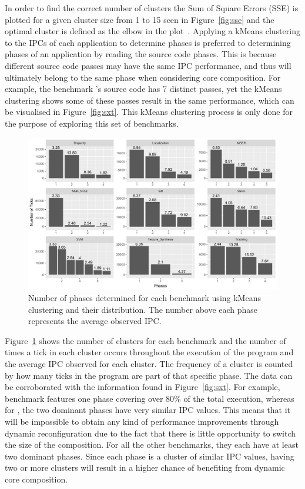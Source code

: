 In order to find the correct number of clusters the Sum of Square Errors (SSE) is plotted for a given cluster size from 1 to 15 seen in Figure~\ref{fig:sse} and the optimal cluster is defined as the elbow in the plot~\cite{everitCluster2001}.
Applying a kMeans clustering to the IPCs of each application to determine phases is preferred to determining phases of an application by reading the source code phases.
This is because different source code passes may have the same IPC performance, and thus will ultimately belong to the same phase when considering core composition.
For example, the benchmark 's source code has 7 distinct passes, yet the kMeans clustering shows some of these passes result in the same performance, which can be visualised in Figure~\ref{fig:sxt}.
This kMeans clustering process is only done for the purpose of exploring this set of benchmarks.

\begin{figure}[t]
    \centering
    \includegraphics[width=1\textwidth]{cases-paper/graphics/Exploration/clusters4.pdf}
    \caption{Number of phases determined for each benchmark using kMeans clustering and their distribution. The number above each phase represents the average observed IPC.}
    \label{fig:clust}
		\vspace{1em}
\end{figure}

Figure~\ref{fig:clust} shows the number of clusters for each benchmark and the number of times a tick in each cluster occurs throughout the execution of the program and the average IPC observed for each cluster.
The frequency of a cluster is counted by how many ticks in the program are part of that specific phase.
The data can be corroborated with the information found in Figure~\ref{fig:sxt}.
For example, benchmark  features one phase covering over 80\% of the total execution, whereas for , the two dominant phases have very similar IPC values.
This means that it will be impossible to obtain any kind of performance improvements through dynamic reconfiguration due to the fact that there is little opportunity to switch the size of the composition.
For all the other benchmarks, they each have at least two dominant phases.
Since each phase is a cluster of similar IPC values, having two or more clusters will result in a higher chance of benefiting from dynamic core composition.

